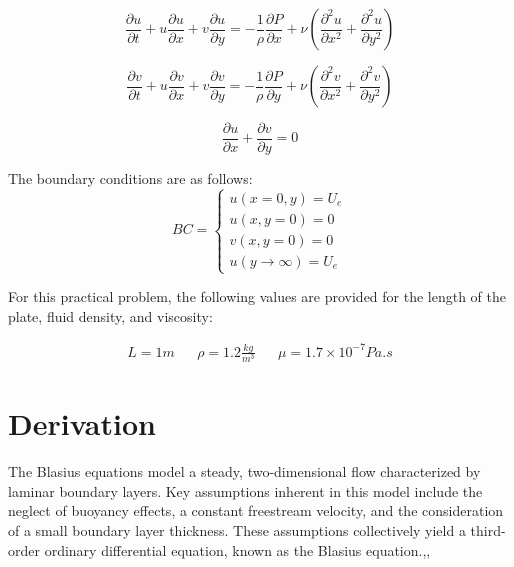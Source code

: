 \documentclass[]{report}
\begin{document}
\begin{equation}
\label{eq:nvu}
    \frac{\partial u}{\partial t} + u\frac{\partial u}{\partial x} + v\frac{\partial u}{\partial y} = - \frac{1}{\rho}\frac{\partial P}{\partial x} + \nu (\frac{\partial ^2 u}{\partial x^2} + \frac{\partial ^2 u}{\partial y^2})
\end{equation}

\begin{equation}
\label{eq:nvv}
    \frac{\partial v}{\partial t} + u\frac{\partial v}{\partial x} + v\frac{\partial v}{\partial y} = - \frac{1}{\rho}\frac{\partial P}{\partial y} + \nu (\frac{\partial ^2 v}{\partial x^2} + \frac{\partial ^2 v}{\partial y^2})
\end{equation}

\begin{equation}
\label{eq:con}
    \frac{\partial u}{\partial x} + \frac{\partial v}{\partial y} = 0
\end{equation}

The boundary conditions are as follows:
\begin{equation}
  BC =
    \begin{cases}
      u(x=0,y) = U_e\\
      u(x,y=0) = 0\\
      v(x,y=0) = 0\\
      u(y\rightarrow \infty) = U_e
    \end{cases}       
\end{equation}

For this practical problem, the following values are provided for the length of the plate, fluid density, and viscosity:

\begin{align}
    L =1m && \rho=1.2 \frac{kg}{m^3} && \mu = 1.7 \times 10^{-7} Pa.s
\end{align}

\chapter{Derivation}
\label{chap:der}
The Blasius equations model a steady, two-dimensional flow characterized by laminar boundary layers. Key assumptions inherent in this model include the neglect of buoyancy effects, a constant freestream velocity, and the consideration of a small boundary layer thickness. These assumptions collectively yield a third-order ordinary differential equation, known as the Blasius equation.\cite{DavidMarshall},\cite{MIT},\cite{Booki}
\end{document}
